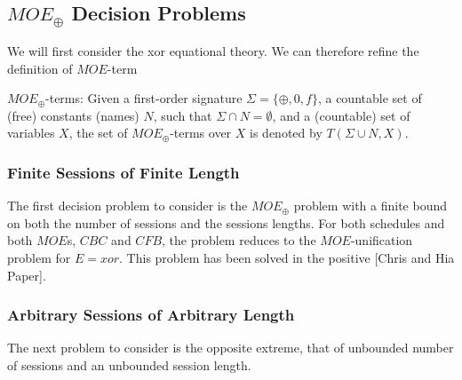 \documentclass{llncs}
\begin{document}
\subsection{$MOE_{\oplus}$ Decision Problems}
We will first consider the xor equational theory. We can therefore refine the definition of $MOE$-term 
 
\begin{definition}
	$MOE_{\oplus}$-terms: Given a first-order signature $\Sigma=\{
	\oplus, 0, f\}$, a countable set of (free) constants (names) $N$, such that $\Sigma \cap N =\emptyset$, and a (countable) set of variables $X$, the set of $MOE_{\oplus}$-terms over $X$ is denoted by $T(\Sigma \cup N,X)$. 
\end{definition}

\subsubsection{Finite Sessions of Finite Length}
The first decision problem to consider is the $MOE_{\oplus}$
problem with a finite bound on both the number of sessions and
the sessions lengths. 
For both schedules and both $MOE$s, $CBC$ and $CFB$, the problem
reduces to the $MOE$-unification problem for $E=xor$. This problem
has been solved in the positive [Chris and Hia Paper].

\subsubsection{Arbitrary Sessions of Arbitrary Length}
The next problem to consider is the opposite extreme, that of unbounded
number of sessions and an unbounded session length. 
\end{document}
